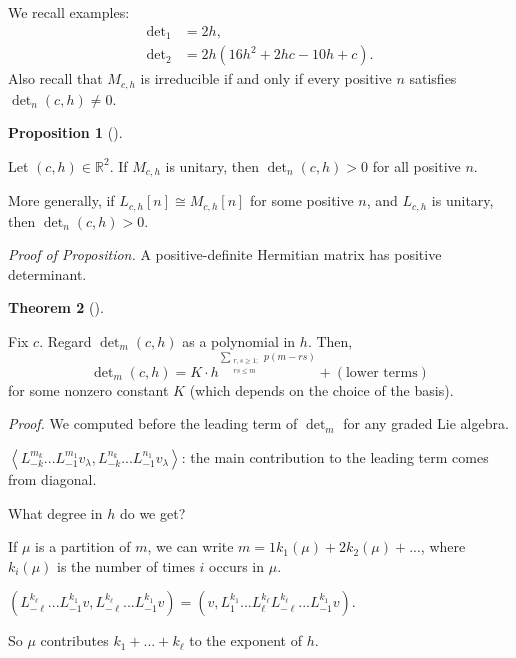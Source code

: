 \documentclass
[numbers=enddot,12pt,final,onecolumn,german,notitlepage]{scrartcl}%
\theoremstyle{definition}
\newtheorem{theo}{Theorem}
\newenvironment{theorem}[1][]
{\begin{theo}[#1]\begin{leftbar}}
{\end{leftbar}\end{theo}}
\newtheorem{prop}[theo]{Proposition}
\newenvironment{proposition}[1][]
{\begin{prop}[#1]\begin{leftbar}}
{\end{leftbar}\end{prop}}
\begin{document}
We recall examples:%
\begin{align*}
\det\nolimits_{1}  &  =2h,\\
\det\nolimits_{2}  &  =2h\left(  16h^{2}+2hc-10h+c\right)  .
\end{align*}
Also recall that $M_{c,h}$ is irreducible if and only if every positive $n$
satisfies $\det\nolimits_{n}\left(  c,h\right)  \neq0$.

\begin{proposition}
Let $\left(  c,h\right)  \in\mathbb{R}^{2}$. If $M_{c,h}$ is unitary, then
$\det\nolimits_{n}\left(  c,h\right)  >0$ for all positive $n$.

More generally, if $L_{c,h}\left[  n\right]  \cong M_{c,h}\left[  n\right]  $
for some positive $n$, and $L_{c,h}$ is unitary, then $\det\nolimits_{n}%
\left(  c,h\right)  >0$.
\end{proposition}

\textit{Proof of Proposition.} A positive-definite Hermitian matrix has
positive determinant.

\begin{theorem}
\label{thm.kac.leader}Fix $c$. Regard $\det\nolimits_{m}\left(  c,h\right)  $
as a polynomial in $h$. Then,%
\[
\det\nolimits_{m}\left(  c,h\right)  =K\cdot h^{\sum\limits_{\substack{r,s\geq
1;\\rs\leq m}}p\left(  m-rs\right)  }+\left(  \text{lower terms}\right)
\]
for some nonzero constant $K$ (which depends on the choice of the basis).
\end{theorem}

\textit{Proof.} We computed before the leading term of $\det\nolimits_{m}$ for
any graded Lie algebra.

$\left\langle L_{-k}^{m_{k}}...L_{-1}^{m_{1}}v_{\lambda},L_{-k}^{n_{k}%
}...L_{-1}^{n_{1}}v_{\lambda}\right\rangle $: the main contribution to the
leading term comes from diagonal.

What degree in $h$ do we get?

If $\mu$ is a partition of $m$, we can write $m=1k_{1}\left(  \mu\right)
+2k_{2}\left(  \mu\right)  +...$, where $k_{i}\left(  \mu\right)  $ is the
number of times $i$ occurs in $\mu$.

$\left(  L_{-\ell}^{k_{\ell}}...L_{-1}^{k_{1}}v,L_{-\ell}^{k_{\ell}}%
...L_{-1}^{k_{1}}v\right)  =\left(  v,L_{1}^{k_{1}}...L_{\ell}^{k_{\ell}%
}L_{-\ell}^{k_{\ell}}...L_{-1}^{k_{1}}v\right)  $.

So $\mu$ contributes $k_{1}+...+k_{\ell}$ to the exponent of $h$.
\end{document}
